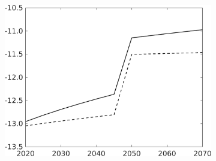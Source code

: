 \begin{figure}[h!!]
\begin{subfigure}[]{0.4\textwidth}
	\includegraphics[width=1\textwidth]{../../codding_model/own_basedOnFried/optimalPol_010922_revision/figures/all_13Sept22/CompTaufPER_bytaul_KN_Reg5_GFF_spillover0_nsk0_xgr0_knspil0_sep0_LFlimit1_emsbase0_countec0_GovRev0_etaa0.79_lgd0.png}
\end{subfigure}	
	\vspace{2mm}

\begin{minipage}[]{0.04\textwidth}
	\
\end{minipage}


\end{figure}
